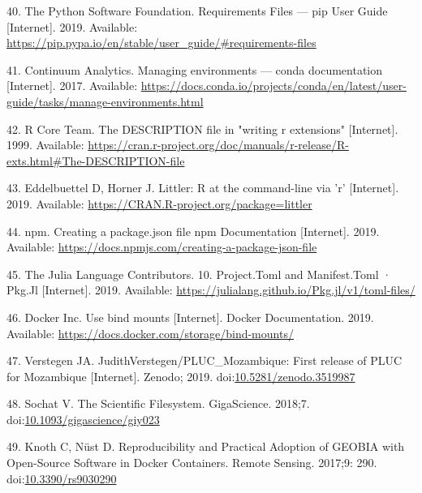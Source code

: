 \documentclass[10pt,letterpaper]{article}
\begin{document}
\leavevmode\hypertarget{ref-the_python_software_foundation_requirements_2019}{}%
40. The Python Software Foundation. Requirements Files --- pip User
Guide {[}Internet{]}. 2019. Available:
\url{https://pip.pypa.io/en/stable/user_guide/\#requirements-files}

\leavevmode\hypertarget{ref-continuum_analytics_managing_2017}{}%
41. Continuum Analytics. Managing environments --- conda documentation
{[}Internet{]}. 2017. Available:
\url{https://docs.conda.io/projects/conda/en/latest/user-guide/tasks/manage-environments.html}

\leavevmode\hypertarget{ref-r_core_team_description_1999}{}%
42. R Core Team. The DESCRIPTION file in "writing r extensions"
{[}Internet{]}. 1999. Available:
\url{https://cran.r-project.org/doc/manuals/r-release/R-exts.html\#The-DESCRIPTION-file}

\leavevmode\hypertarget{ref-eddelbuettel_littler_2019}{}%
43. Eddelbuettel D, Horner J. Littler: R at the command-line via 'r'
{[}Internet{]}. 2019. Available:
\url{https://CRAN.R-project.org/package=littler}

\leavevmode\hypertarget{ref-npm_creating_2019}{}%
44. npm. Creating a package.json file npm Documentation {[}Internet{]}.
2019. Available:
\url{https://docs.npmjs.com/creating-a-package-json-file}

\leavevmode\hypertarget{ref-julia_tomls_2019}{}%
45. The Julia Language Contributors. 10. Project.Toml and Manifest.Toml
· Pkg.Jl {[}Internet{]}. 2019. Available:
\url{https://julialang.github.io/Pkg.jl/v1/toml-files/}

\leavevmode\hypertarget{ref-docker_use_2019}{}%
46. Docker Inc. Use bind mounts {[}Internet{]}. Docker Documentation.
2019. Available: \url{https://docs.docker.com/storage/bind-mounts/}

\leavevmode\hypertarget{ref-verstegen_pluc_mozambique_2019}{}%
47. Verstegen JA. JudithVerstegen/PLUC\_Mozambique: First release of
PLUC for Mozambique {[}Internet{]}. Zenodo; 2019.
doi:\href{https://doi.org/10.5281/zenodo.3519987}{10.5281/zenodo.3519987}

\leavevmode\hypertarget{ref-sochat_scientific_2018}{}%
48. Sochat V. The Scientific Filesystem. GigaScience. 2018;7.
doi:\href{https://doi.org/10.1093/gigascience/giy023}{10.1093/gigascience/giy023}

\leavevmode\hypertarget{ref-knoth_reproducibility_2017}{}%
49. Knoth C, Nüst D. Reproducibility and Practical Adoption of GEOBIA
with Open-Source Software in Docker Containers. Remote Sensing. 2017;9:
290. doi:\href{https://doi.org/10.3390/rs9030290}{10.3390/rs9030290}
\end{document}

